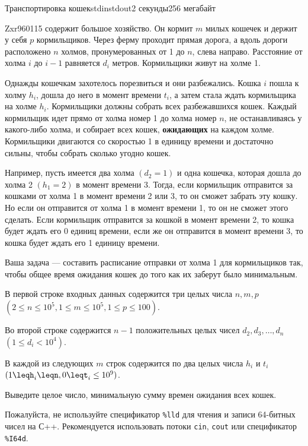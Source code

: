 \begin{problem}{Транспортировка кошек}{stdin}{stdout}{2 секунды}{256 мегабайт}

Zxr960115 содержит большое хозяйство. Он кормит $m$ милых кошечек и держит у себя $p$ кормильщиков. Через ферму проходит прямая дорога, а вдоль дороги расположено $n$ холмов, пронумерованных от 1 до $n$, слева направо. Расстояние от холма $i$ до $i-1$ равняется $d_i$ метров. Кормильщики живут на холме 1.

Однажды кошечкам захотелось порезвиться и они разбежались. Кошка $i$ пошла к холму $h_i$, дошла до него в момент времени $t_i$, а затем стала ждать кормильщика на холме $h_i$. Кормильщики должны собрать всех разбежавшихся кошек. Каждый кормильщик идет прямо от холма номер 1 до холма номер $n$, не останавливаясь у какого-либо холма, и собирает всех кошек, \textbf{ожидающих} на каждом холме. Кормильщики двигаются со скоростью 1 в единицу времени и достаточно сильны, чтобы собрать сколько угодно кошек.

Например, пусть имеется два холма $(d_2 = 1)$ и одна кошечка, которая дошла до холма 2 $(h_1 = 2)$ в момент времени 3. Тогда, если кормильщик отправится за кошками от холма 1 в момент времени 2 или 3, то он сможет забрать эту кошку. Но если он отправится от холма 1 в момент времени 1, то он не сможет этого сделать. Если кормильщик отправится за кошкой в момент времени 2, то кошка будет ждать его 0 единиц времени, если же он отправится в момент времени 3, то кошка будет ждать его 1 единицу времени.

Ваша задача --- составить расписание отправки от холма 1 для кормильщиков так, чтобы общее время ожидания кошек до того как их заберут было минимальным.

\InputFile
В первой строке входных данных содержится три целых числа $n, m, p$ $(2 \leq n \leq 10^5, 1 \leq m \leq 10^5, 1 \leq p \leq 100)$.

Во второй строке содержится $n-1$ положительных целых чисел $d_2, d_3, \dots, d_n$ $(1 \le d_i < 10^4)$.

В каждой из следующих $m$ строк содержится по два целых числа $h_i$ и $t_i$ $(1\leqh_i\leqn, 0\leqt_i\leq10^9)$.


\OutputFile
Выведите целое число, минимальную сумму времен ожидания всех кошек.

Пожалуйста, не используйте спецификатор \texttt{\%lld} для чтения и записи 64-битных чисел на С++. Рекомендуется использовать потоки \texttt{cin}, \texttt{cout} или спецификатор \texttt{\%I64d}.


\Examples

\begin{example}
%
\end{example}

\end{problem}
